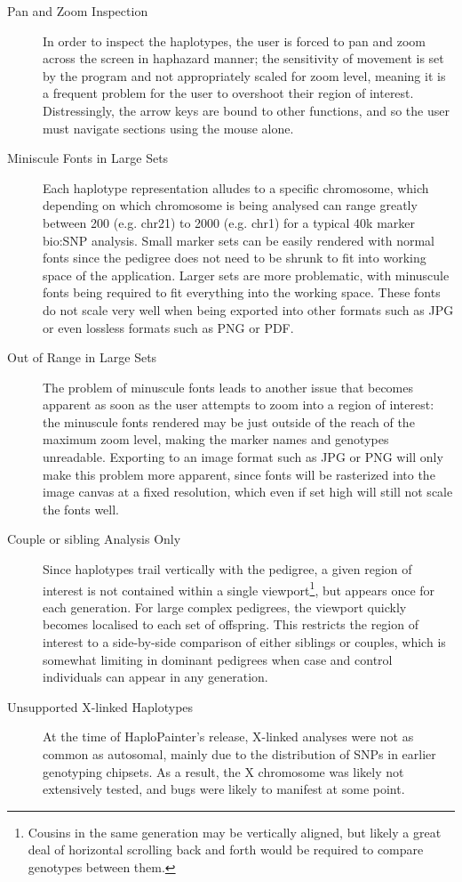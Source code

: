 \begin{description}
\item[Pan and Zoom Inspection]{In order to inspect the haplotypes, the user is forced to pan and zoom across the screen in haphazard manner; the sensitivity of movement is set by the program and not appropriately scaled for zoom level, meaning it is a frequent problem for the user to overshoot their region of interest. Distressingly, the arrow keys are bound to other functions, and so the user must navigate sections using the mouse alone.}
\item[Miniscule Fonts in Large Sets]{Each haplotype representation alludes to a specific chromosome, which depending on which chromosome is being analysed can range greatly between 200 (e.g. chr21) to 2000 (e.g. chr1) for a typical 40k marker \gls{bio:SNP} analysis. Small marker sets can be easily rendered with normal fonts since the pedigree does not need to be shrunk to fit into working space of the application. Larger sets are more problematic, with minuscule fonts being required to fit everything into the working space. These fonts do not scale very well when being exported into other formats such as JPG or even lossless formats such as PNG or PDF.}
\item[Out of Range in Large Sets]{The problem of minuscule fonts leads to another issue that becomes apparent as soon as the user attempts to zoom into a region of interest: the minuscule fonts rendered may be just outside of the reach of the maximum zoom level, making the marker names and genotypes unreadable. Exporting to an image format such as JPG or PNG will only make this problem more apparent, since fonts will be rasterized into the image canvas at a fixed resolution, which even if set high will still not scale the fonts well.}
\item[Couple or sibling Analysis Only]{Since haplotypes trail vertically with the pedigree, a given region of interest is not contained within a single viewport\footnote{Cousins in the same generation may be vertically aligned, but likely a great deal of horizontal scrolling back and forth would be required to compare genotypes between them.}, but appears once for each generation. For large complex pedigrees, the viewport quickly becomes localised to each set of offspring. This restricts the region of interest to a side-by-side comparison of either siblings or couples, which is somewhat limiting in dominant pedigrees when case and control individuals can appear in any generation.}
\item[Unsupported X-linked Haplotypes]{At the time of HaploPainter's release, X-linked analyses were not as common as autosomal, mainly due to the distribution of SNPs in earlier genotyping chipsets. As a result, the X chromosome was likely not extensively tested, and bugs were likely to manifest at some point.}
\end{description}

